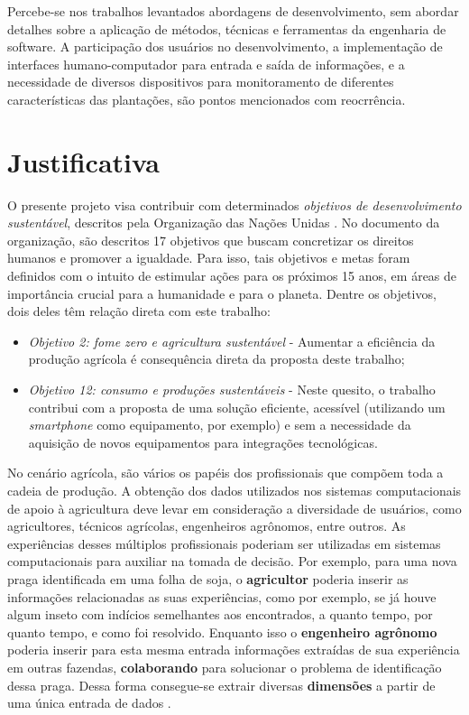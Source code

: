 \documentclass[12pt]{article}
\begin{document}
Percebe-se nos trabalhos levantados abordagens de desenvolvimento, sem abordar detalhes sobre a aplicação de métodos, técnicas e ferramentas da engenharia de software. A participação dos usuários no desenvolvimento, a implementação de interfaces humano-computador para entrada e saída de informações, e a necessidade de diversos dispositivos para monitoramento de diferentes características das plantações, são pontos mencionados com reocrrência.

\section{Justificativa}
\label{sec:justificativa}

O presente projeto visa contribuir com determinados \textit{objetivos de desenvolvimento sustentável}, descritos pela Organização das Nações Unidas \cite{ONU:2020}. No documento da organização, são descritos 17 objetivos que buscam concretizar os direitos humanos e promover a igualdade. Para isso, tais objetivos e metas foram definidos com o intuito de estimular ações para os próximos 15 anos, em áreas de importância crucial para a humanidade e para o planeta. Dentre os objetivos, dois deles têm relação direta com este trabalho:

\begin{itemize}
	\item \textit{Objetivo 2: fome zero e agricultura sustentável} - Aumentar a eficiência da produção agrícola é consequência direta da proposta deste trabalho;
	\item \textit{Objetivo 12: consumo e produções sustentáveis} - Neste quesito, o trabalho contribui com a proposta de uma solução eficiente, acessível (utilizando um \textit{smartphone} como equipamento, por exemplo) e sem a necessidade da aquisição de novos equipamentos para integrações tecnológicas.
\end{itemize}

No cenário agrícola, são vários os papéis dos profissionais que compõem toda a cadeia de produção. A obtenção dos dados utilizados nos sistemas computacionais de apoio à agricultura deve levar em consideração a diversidade de usuários, como agricultores, técnicos agrícolas, engenheiros agrônomos, entre outros. As experiências desses múltiplos profissionais poderiam ser utilizadas em sistemas computacionais para auxiliar na tomada de decisão. Por exemplo, para uma nova praga identificada em uma folha de soja, o \textbf{agricultor} poderia inserir as informações relacionadas as suas experiências, como por exemplo, se já houve algum inseto com indícios semelhantes aos encontrados, a quanto tempo, por quanto tempo, e como foi resolvido. Enquanto isso o \textbf{engenheiro agrônomo} poderia inserir para esta mesma entrada informações extraídas de sua experiência em outras fazendas, \textbf{colaborando} para solucionar o problema de identificação dessa praga. Dessa forma consegue-se extrair diversas \textbf{dimensões} a partir de uma única entrada de dados \cite{Walling:2020}.
\end{document}
